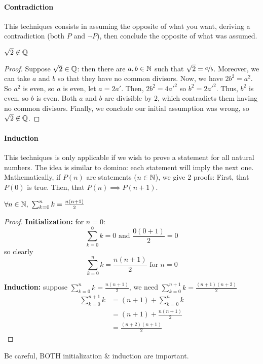 \paragraph{Contradiction}
This techniques consists in assuming the opposite of what you want, deriving a contradiction (both $P$ and $\lnot P$), then conclude the opposite of what was assumed.
\begin{property}
    $\sqrt{2} \not\in \mathbb{Q}$
\end{property}
\begin{proof}
    Suppose $\sqrt{2} \in \mathbb{Q}$: then there are $a,b \in \mathbb{N}$ such that $\sqrt{2} = \nicefrac{a}{b}$.
    Moreover, we can take $a$ and $b$ so that they have no common divisors.
    Now, we have $2b^2 = a^2$. So $a^2$ is even, so $a$ is even, let $a = 2a'$.
    Then, $2b^2 = 4a'^2$ so $b^2 = 2a'^2$. Thus, $b^2$ is even, so $b$ is even.
    Both $a$ and $b$ are divisible by $2$, which contradicts them having no common divisors.
    Finally, we conclude our initial assumption was wrong, so $\sqrt{2} \not\in \mathbb{Q}$.
\end{proof}
\paragraph{Induction}
This techniques is only applicable if we wish to prove a statement for all natural numbers.
The idea is similar to domino: each statement will imply the next one.
Mathematically, if $P(n)$ are statements ($n \in \mathbb{N}$), we give 2 proofs:
First, that $P(0)$ is true.
Then, that $P(n) \implies P(n+1)$.
\begin{property}
    $\forall n \in \mathbb{N}, \ \sum_{k=0}^{n} k = \frac{n(n+1)}{2}$
\end{property}
\begin{proof}
    \textbf{Initialization:} for $n=0$:\\
    $$\sum_{k=0}^{0} k = 0 \text{ and } \frac{0(0+1)}{2}=0$$
    so clearly $$\sum_{k=0}^{n} k = \frac{n(n+1)}{2} \text{ for } n=0$$
    
    \textbf{Induction:} suppose $\sum_{k=0}^{n} k = \frac{n(n+1)}{2}$, we need $\sum_{k=0}^{n+1} k = \frac{(n+1)(n+2)}{2}$\\
    \begin{equation*}
        \begin{split}
            \sum_{k=0}^{n+1} k &= (n+1) + \sum_{k=0}^{n} k\\
                               &= (n+1) + \frac{n(n+1)}{2}\\
                               &= \frac{(n+2)(n+1)}{2}
        \end{split}
    \end{equation*}
\end{proof}
Be careful, BOTH initialization \& induction are important.

